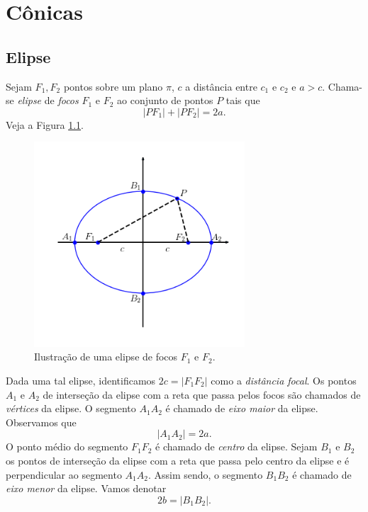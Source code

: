 
\chapter{Cônicas}\label{cap_conicas}
\thispagestyle{fancy}

\section{Elipse}\label{cap_conicas_sec_elipse}

Sejam $F_1,F_2$ pontos sobre um plano $\pi$, $c$ a distância entre $c_1$ e $c_2$ e $a > c$. Chama-se \emph{elipse} de \emph{focos} $F_1$ e $F_2$ ao conjunto de pontos $P$ tais que
\begin{equation}
  |PF_1| + |PF_2| = 2a.
\end{equation}
Veja a Figura \ref{fig:elipse}.

\begin{figure}[H]
  \centering
  \includegraphics[width=0.7\textwidth]{./cap_conicas/dados/fig_elipse/fig_elipse}
  \caption{Ilustração de uma elipse de focos $F_1$ e $F_2$.}
  \label{fig:elipse}
\end{figure}

Dada uma tal elipse, identificamos $2c=|F_1F_2|$ como a \emph{distância focal}. Os pontos $A_1$ e $A_2$ de interseção da elipse com a reta que passa pelos focos são chamados de \emph{vértices} da elipse. O segmento $A_1A_2$ é chamado de \emph{eixo maior} da elipse. Observamos que
\begin{equation}
  |A_1A_2| = 2a.
\end{equation}
O ponto médio do segmento $F_1F_2$ é chamado de \emph{centro} da elipse. Sejam $B_1$ e $B_2$ os pontos de interseção da elipse com a reta que passa pelo centro da elipse e é perpendicular ao segmento $A_1A_2$. Assim sendo, o segmento $B_1B_2$ é chamado de \emph{eixo menor} da elipse. Vamos denotar
\begin{equation}
  2b = |B_1B_2|.
\end{equation}

